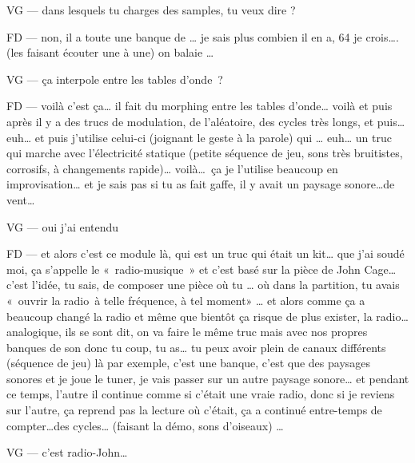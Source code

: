 VG —  dans lesquels tu charges des samples, tu veux dire ? 

FD —  non, il a toute une banque de … je sais plus combien il en a, 64 je crois…. (les faisant écouter une à une) on balaie …  

VG —  ça interpole entre les tables d'onde ? 

FD —  voilà c'est ça… il fait du morphing entre les tables d'onde… voilà et puis après il y a des trucs de modulation, de l'aléatoire, des cycles très longs, et puis… euh… et puis j'utilise celui-ci (joignant le geste à la parole) qui … euh… un truc qui marche avec l'électricité statique (petite séquence de jeu, sons très bruitistes, corrosifs, à changements rapide)… voilà… ça je l'utilise beaucoup en improvisation… et je sais pas si tu as fait gaffe, il y avait un paysage sonore…de vent…  

VG —  oui j'ai entendu 

FD —  et alors c'est ce module là, qui est un truc qui était un kit… que j'ai soudé moi, ça s'appelle le « radio-musique » et c'est basé sur la pièce de John Cage… c'est l'idée, tu sais, de composer une pièce où tu … où dans la partition, tu avais « ouvrir la radio à telle fréquence, à tel moment» … et alors comme ça a beaucoup changé la radio et même que bientôt ça risque de plus exister, la radio… analogique, ils se sont dit, on va faire le même  truc mais avec nos propres banques de son donc tu coup, tu as… tu peux avoir plein de canaux différents (séquence de jeu) là par exemple, c'est une banque, c'est que des paysages sonores et je joue le tuner, je vais passer sur un autre paysage sonore… et pendant ce temps, l'autre il continue comme si c'était une vraie radio, donc si je reviens sur  l'autre, ça reprend pas la lecture où c'était, ça a continué entre-temps de compter…des cycles… (faisant la démo, sons d'oiseaux) …  

VG —  c'est radio-John… 


